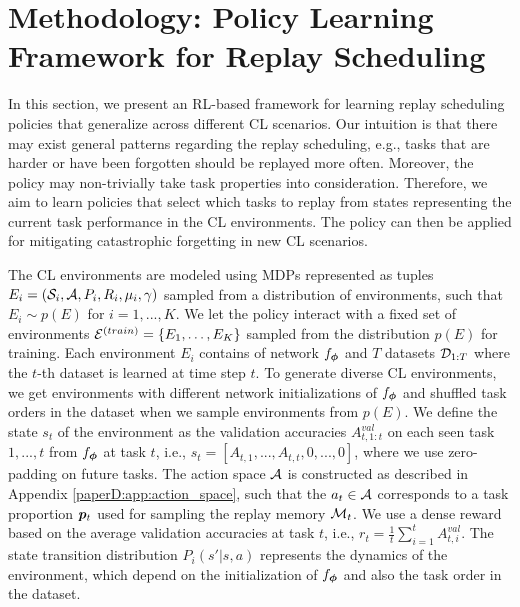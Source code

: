 
\section[Methodology]{Methodology: Policy Learning Framework for Replay Scheduling}\label{paperD:sec:methodology}

In this section, we present an RL-based framework for learning replay scheduling policies that generalize across different CL scenarios. Our intuition is that there may exist general patterns regarding the replay scheduling, e.g., tasks that are harder or have been forgotten should be replayed more often. Moreover, the policy may non-trivially take task properties into consideration. Therefore, we aim to learn policies that select which tasks to replay from states representing the current task performance in the CL environments. The policy can then be applied for mitigating catastrophic forgetting in new CL scenarios. 


The CL environments are modeled using MDPs represented as tuples $E_i = ({\mathcal{S}}_i, {\mathcal{A}}, P_i, R_i, \mu_i, \gamma)$ sampled from a distribution of environments, such that $E_i \sim p(E)$ for $i=1, ..., K$. 
We let the policy interact with a fixed set of environments ${\mathcal{E}}^{(train)} = \{E_1, \dots, E_K\}$ sampled from the distribution $p(E)$ for training. 
Each environment $E_i$ contains of network $f_{{\bm{\phi}}}$ and $T$ datasets ${\mathcal{D}}_{1:T}$ where the $t$-th dataset is learned at time step $t$. To generate diverse CL environments, we get environments with different network initializations of $f_{{\bm{\phi}}}$ and shuffled task orders in the dataset when we sample environments from $p(E)$. 
We define the state $s_t$ of the environment as the validation accuracies $A_{t, 1:t}^{val}$ on each seen task $1, ..., t$ from $f_{{\bm{\phi}}}$ at task $t$, i.e., $s_t = [A_{t, 1}, ..., A_{t, t}, 0, ..., 0]$, where we use zero-padding on future tasks. The action space ${\mathcal{A}}$ is constructed as described in Appendix \ref{paperD:app:action_space}, such that the $a_t \in {\mathcal{A}}$ corresponds to a task proportion ${\bm{p}}_t$ used for sampling the replay memory ${\mathcal{M}}_t$. We use a dense reward based on the average validation accuracies at task $t$, i.e., $r_{t} = \frac{1}{t}\sum_{i=1}^{t} A_{t, i}^{val}$. The state transition distribution $P_i(s' | s, a)$ represents the dynamics of the environment, which depend on the initialization of $f_{{\bm{\phi}}}$ and also the task order in the dataset. 

